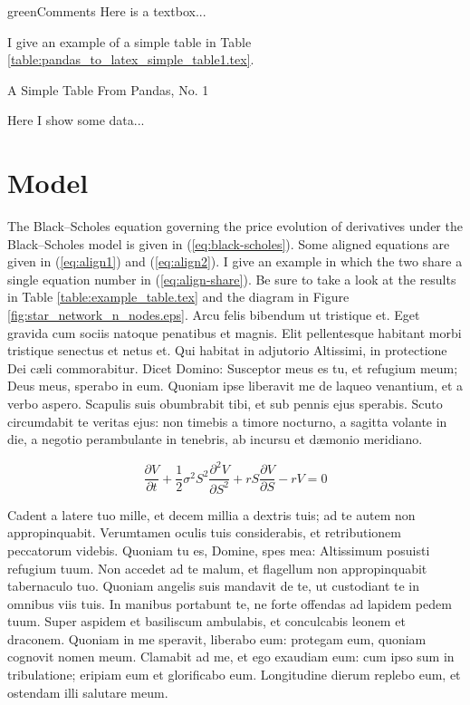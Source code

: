 \documentclass[12pt]{article}
\begin{document}
\begin{textbox}{green}{Comments}
Here is a textbox...
\end{textbox}

I give an example of a simple table in Table \ref{table:pandas_to_latex_simple_table1.tex}.


\begin{table}
\caption{A Simple Table From Pandas, No. 1}
\centering

\caption*{
  Here I show some data...
}
\label{table:pandas_to_latex_simple_table1.tex}
\end{table}


\section{Model}

The Black–Scholes equation governing the price evolution of derivatives under
the Black–Scholes model is given in (\ref{eq:black-scholes}). Some aligned
equations are given in (\ref{eq:align1}) and (\ref{eq:align2}). I give an
example in which the two share a single equation number in
(\ref{eq:align-share}). Be sure to take a look at the results in 
Table \ref{table:example_table.tex} and the diagram in 
Figure \ref{fig:star_network_n_nodes.eps}.
Arcu felis bibendum ut tristique et. Eget gravida
cum sociis natoque penatibus et magnis. Elit pellentesque habitant morbi
tristique senectus et netus et.
Qui habitat in adjutorio Altissimi,
in protectione Dei cæli commorabitur.
Dicet Domino: Susceptor meus es tu, et refugium meum;
Deus meus, sperabo in eum.
Quoniam ipse liberavit me de laqueo venantium,
et a verbo aspero.
Scapulis suis obumbrabit tibi,
et sub pennis ejus sperabis.
Scuto circumdabit te veritas ejus:
non timebis a timore nocturno,
a sagitta volante in die,
a negotio perambulante in tenebris,
ab incursu et dæmonio meridiano.

\begin{equation}
\frac{\partial V}{\partial t} + \frac{1}{2}\sigma^2 S^2 \frac{\partial^2 V}{\partial S^2} 
+ rS\frac{\partial V}{\partial S} - rV = 0
\label{eq:black-scholes}
\end{equation}

Cadent a latere tuo mille,
et decem millia a dextris tuis;
ad te autem non appropinquabit.
Verumtamen oculis tuis considerabis,
et retributionem peccatorum videbis.
Quoniam tu es, Domine, spes mea:
Altissimum posuisti refugium tuum.
Non accedet ad te malum,
et flagellum non appropinquabit tabernaculo tuo.
Quoniam angelis suis mandavit de te,
ut custodiant te in omnibus viis tuis.
In manibus portabunt te,
ne forte offendas ad lapidem pedem tuum.
Super aspidem et basiliscum ambulabis,
et conculcabis leonem et draconem.
Quoniam in me speravit, liberabo eum:
protegam eum, quoniam cognovit nomen meum.
Clamabit ad me, et ego exaudiam eum:
cum ipso sum in tribulatione;
eripiam eum et glorificabo eum.
Longitudine dierum replebo eum,
et ostendam illi salutare meum.
\end{document}
